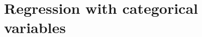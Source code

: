 \documentclass[unknownkeysallowed]{beamer}\usepackage[]{graphicx}\usepackage[]{color}
\begin{document}




\section{Regression with categorical variables}

\frame{\sectionpage}
\end{document}
